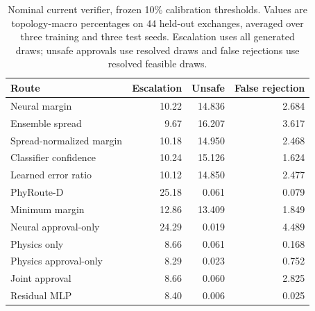 \begin{table}[tb]
\caption{Nominal current verifier, frozen 10\% calibration thresholds. Values are topology-macro percentages on 44 held-out exchanges, averaged over three training and three test seeds. Escalation uses all generated draws; unsafe approvals use resolved draws and false rejections use resolved feasible draws.}
\label{tab:nominal}
\centering\small
\begin{tabular}{lrrr}
\toprule
Route & Escalation & Unsafe & False rejection \\
\midrule
Neural margin & 10.22 & 14.836 & 2.684 \\
Ensemble spread & 9.67 & 16.207 & 3.617 \\
Spread-normalized margin & 10.18 & 14.950 & 2.468 \\
Classifier confidence & 10.24 & 15.126 & 1.624 \\
Learned error ratio & 10.12 & 14.850 & 2.477 \\
PhyRoute-D & 25.18 & 0.061 & 0.079 \\
Minimum margin & 12.86 & 13.409 & 1.849 \\
Neural approval-only & 24.29 & 0.019 & 4.489 \\
Physics only & 8.66 & 0.061 & 0.168 \\
Physics approval-only & 8.29 & 0.023 & 0.752 \\
Joint approval & 8.66 & 0.060 & 2.825 \\
Residual MLP & 8.40 & 0.006 & 0.025 \\
\bottomrule
\end{tabular}
\end{table}
